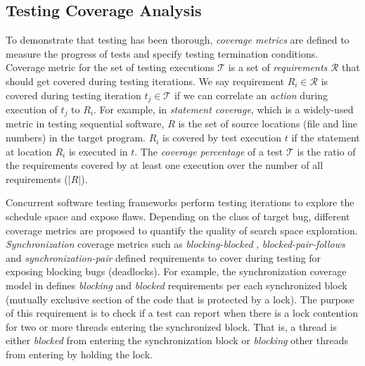\subsection{Testing Coverage Analysis}
\label{sec:coverage}
To demonstrate that testing has been thorough, \textit{coverage metrics} are defined to measure the progress of tests and specify testing termination conditions.
%
Coverage metric for the set of testing executions $\mathcal{T}$ is a set of \textit{requirements} $\mathcal{R}$ that should get covered during testing iterations.
%
We say requirement $R_i \in \mathcal{R}$ is covered during testing iteration $t_j \in \mathcal{T}$ if we can correlate an \textit{action} during execution of $t_j$ to $R_i$.
%
For example, in \textit{statement coverage}, which is a widely-used metric in testing sequential software, $R$ is the set of source locations (file and line numbers) in the target program.
%
$R_i$ is covered by test execution $t$ if the statement at location $R_i$ is executed in $t$.
%
The \textit{coverage percentage} of a test $\mathcal{T}$ is the ratio of the requirements covered by at least one execution over the number of all requirements ($|R|$).

Concurrent software testing frameworks perform testing iterations to explore the schedule space and expose flaws.
%
Depending on the class of target bug, different coverage metrics are proposed to quantify the quality of search space exploration.
%
\textit{Synchronization} coverage metrics such as \textit{blocking-blocked} \cite{edelstein2003contest}, \textit{blocked-pair-follows} \cite{trainin-followsCoverage-padtad09} and \textit{synchronization-pair} \cite{hong-syncTesting-issta12} defined requirements to cover during testing for exposing blocking bugs (\eg deadlocks).
%
%
For example, the synchronization coverage model in \cite{edelstein2003contest} defines \textit{blocking} and \textit{blocked} requirements per each synchronized block (\ie mutually exclusive section of the code that is protected by a lock).
%
The purpose of this requirement is to check if a test can report when there is a lock contention for two or more threads entering the synchronized block.
%
That is, a thread is either \textit{blocked} from entering the synchronization block or \textit{blocking} other threads from entering by holding the lock.
%



